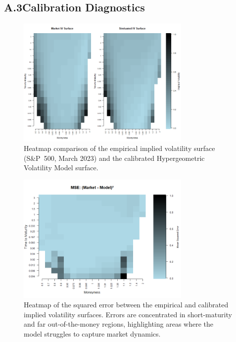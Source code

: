 \newpage
\subsection*{A.3\quad Calibration Diagnostics}

\begin{figure}[H]
    \centering
    \includegraphics[width=0.75\textwidth]{figures/A.3 Calibration Diagnostics/market_best_fit_heatmap.png}
    \caption{Heatmap comparison of the empirical implied volatility surface (S\&P~500, March 2023) 
    and the calibrated Hypergeometric Volatility Model surface.}
    \label{fig:HeatmapMarketBestFit}
\end{figure}

\begin{figure}[H]
    \centering
    \includegraphics[width=0.75\textwidth]{figures/A.3 Calibration Diagnostics/market_best_fit_mse_heatmap.png}
    \caption{Heatmap of the squared error between the empirical and calibrated implied volatility surfaces. 
    Errors are concentrated in short-maturity and far out-of-the-money regions, 
    highlighting areas where the model struggles to capture market dynamics.}
    \label{fig:HeatmapMarketBestFitMSE}
\end{figure}
